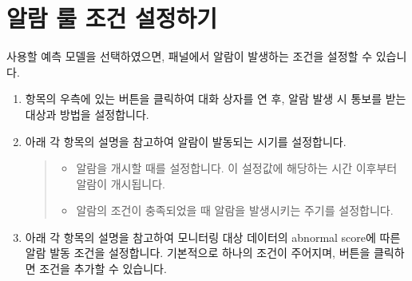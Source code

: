 \documentclass[letterpaper,10pt,english]{sphinxmanual}
\begin{document}
\section{알람 룰 조건 설정하기}
\label{\detokenize{anomaly/part02/index:alarm-rule-settings}}\label{\detokenize{anomaly/part02/index:id6}}
사용할 예측 모델을 선택하였으면,  패널에서 알람이 발생하는 조건을 설정할 수 있습니다.
\begin{enumerate}
\def\theenumi{\arabic{enumi}}
\def\labelenumi{\theenumi .}
\makeatletter\def\p@enumii{\p@enumi \theenumi .}\makeatother
\item {} 
 항목의 우측에 있는  버튼을 클릭하여 대화 상자를 연 후, 알람 발생 시 통보를 받는 대상과 방법을 설정합니다.
\begin{quote}

\begin{figure}[H]
\centering

\noindent{}
\end{figure}
\end{quote}

\item {} 
아래 각 항목의 설명을 참고하여 알람이 발동되는 시기를 설정합니다.
\begin{quote}

\begin{figure}[H]
\centering

\noindent{}
\end{figure}
\begin{itemize}
\item {} 
 알람을 개시할 때를 설정합니다. 이 설정값에 해당하는 시간 이후부터 알람이 개시됩니다.

\item {} 
 알람의 조건이 충족되었을 때 알람을 발생시키는 주기를 설정합니다.

\end{itemize}
\end{quote}

\item {} 
아래 각 항목의 설명을 참고하여 모니터링 대상 데이터의 abnormal score에 따른 알람 발동 조건을 설정합니다. 기본적으로 하나의 조건이 주어지며,  버튼을 클릭하면 조건을 추가할 수 있습니다.
\begin{quote}


\end{quote}
\end{enumerate}
\end{document}
